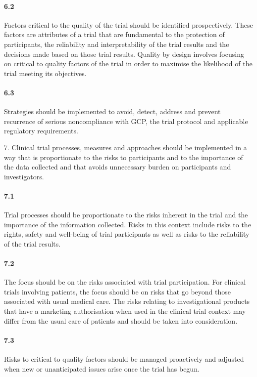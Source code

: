 \documentclass[11pt]{article}
\begin{document}
\paragraph{6.2} Factors critical to the quality of the trial should be identified prospectively. These factors are attributes of a trial that are fundamental to the protection of participants, the reliability and interpretability of the trial results and the decisions made based on those trial results. Quality by design involves focusing on critical to quality factors of the trial in order to maximise the likelihood of the trial meeting its objectives.

\paragraph{6.3} Strategies should be implemented to avoid, detect, address and prevent recurrence of serious noncompliance with GCP, the trial protocol and applicable regulatory requirements.

7. Clinical trial processes, measures and approaches should be implemented in a way that is proportionate to the risks to participants and to the importance of the data collected and that avoids unnecessary burden on participants and investigators.


\paragraph{7.1} Trial processes should be proportionate to the risks inherent in the trial and the importance of the information collected. Risks in this context include risks to the rights, safety and well-being of trial participants as well as risks to the reliability of the trial results.

\paragraph{7.2} The focus should be on the risks associated with trial participation. For clinical trials involving patients, the focus should be on risks that go beyond those associated with usual medical care. The risks relating to investigational products that have a marketing authorisation when used in the clinical trial context may differ from the usual care of patients and should be taken into consideration.

\paragraph{7.3} Risks to critical to quality factors should be managed proactively and adjusted when new or unanticipated issues arise once the trial has begun.
\end{document}

